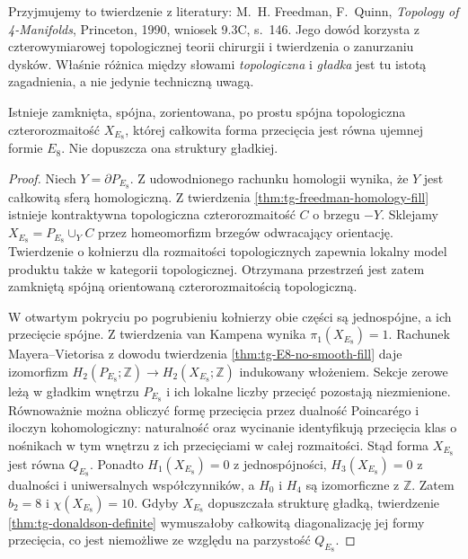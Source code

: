 Przyjmujemy to twierdzenie z literatury:
M.~H. Freedman, F.~Quinn,
\emph{Topology of 4-Manifolds}, Princeton, 1990,
wniosek 9.3C, s.~146. Jego dowód
korzysta z czterowymiarowej topologicznej teorii chirurgii
i twierdzenia o zanurzaniu dysków. Właśnie różnica między
słowami \emph{topologiczna} i \emph{gładka} jest tu istotą
zagadnienia, a nie jedynie techniczną uwagą.

\begin{wniosek}
\label{cor:tg-closed-E8}
Istnieje zamknięta, spójna, zorientowana, po prostu
spójna topologiczna czterorozmaitość $X_{E_8}$,
której całkowita forma przecięcia jest równa
ujemnej formie $E_8$. Nie dopuszcza ona struktury gładkiej.
\end{wniosek}
\begin{proof}
Niech $Y=\partial P_{E_8}$. Z udowodnionego rachunku
homologii wynika, że $Y$ jest całkowitą sferą homologiczną.
Z twierdzenia \ref{thm:tg-freedman-homology-fill}
istnieje kontraktywna topologiczna czterorozmaitość
$C$ o brzegu $-Y$. Sklejamy
$X_{E_8}=P_{E_8}\cup_Y C$ przez homeomorfizm
brzegów odwracający orientację.
Twierdzenie o kołnierzu dla rozmaitości
topologicznych zapewnia lokalny model produktu
także w kategorii topologicznej. Otrzymana
przestrzeń jest zatem zamkniętą spójną
orientowaną czterorozmaitością topologiczną.

W otwartym pokryciu po pogrubieniu kołnierzy
obie części są jednospójne, a ich przecięcie
spójne. Z twierdzenia van Kampena wynika
$\pi_1(X_{E_8})=1$. Rachunek Mayera--Vietorisa
z dowodu twierdzenia \ref{thm:tg-E8-no-smooth-fill}
daje izomorfizm $H_2(P_{E_8};\mathbb Z)\to
H_2(X_{E_8};\mathbb Z)$ indukowany włożeniem.
Sekcje zerowe leżą w gładkim wnętrzu
$P_{E_8}$ i ich lokalne liczby przecięć
pozostają niezmienione.
Równoważnie można obliczyć formę przecięcia
przez dualność Poincarégo i iloczyn kohomologiczny:
naturalność oraz wycinanie identyfikują
przecięcia klas o nośnikach w tym wnętrzu
z ich przecięciami w całej rozmaitości.
Stąd forma $X_{E_8}$ jest równa $Q_{E_8}$.
Ponadto $H_1(X_{E_8})=0$ z jednospójności,
$H_3(X_{E_8})=0$ z dualności i uniwersalnych
współczynników, a $H_0$ i $H_4$ są izomorficzne
z $\mathbb Z$. Zatem $b_2=8$ i $\chi(X_{E_8})=10$.
Gdyby $X_{E_8}$ dopuszczała strukturę gładką,
twierdzenie \ref{thm:tg-donaldson-definite}
wymuszałoby całkowitą diagonalizację jej formy
przecięcia, co jest niemożliwe ze względu
na parzystość $Q_{E_8}$.
\end{proof}

